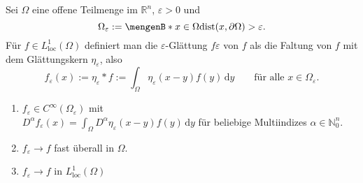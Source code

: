 
\begin{definition*}
	Sei $\Omega$ eine offene Teilmenge im $\mathbb{R}^n$, $\varepsilon >0$ und 
	\[
		\Omega_{\varepsilon} := \set[x \in \Omega]{\dist(x,\partial \Omega)> \varepsilon}.
	\]
	Für $f \in L^1_{\text{loc}}(\Omega)$ definiert man die $\varepsilon$-Glättung $f \varepsilon$ von $f$ als die Faltung von $f$ mit dem Glättungskern $\eta_{\varepsilon}$, also
	\[
		f_{\varepsilon}(x):= \eta_{\varepsilon} * f := \int_{\Omega}^{}\eta_{\varepsilon}(x-y)f(y) \,\mathrm{d}y \qquad \text{für alle }x \in \Omega_{\varepsilon}.
	\]
\end{definition*}

\begin{bemerkung}
	\begin{enumerate}[1)]
		\item $f_{\varepsilon} \in C^{\infty}(\Omega _{\varepsilon})$ mit \\
		$D^{\alpha}f _{\varepsilon}(x)= \int_{\Omega}^{}D^{\alpha} \eta_{\varepsilon}(x-y)f(y) \,\mathrm{d}y$ für beliebige Multiindizes $\alpha \in \mathbb{N}_0^n$.
		\item $f_{\varepsilon} \to f$ fast überall in $\Omega$.
		\item $f_{\varepsilon} \to f$ in $L^1_{\text{loc}}(\Omega)$
	\end{enumerate}
\end{bemerkung}

